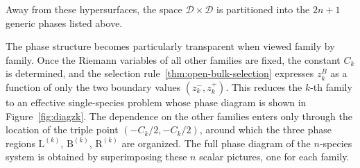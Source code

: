 \documentclass[12pt]{article}
\begin{document}
Away from these hypersurfaces, the space
$\mathcal{D}\times\mathcal{D}$ is partitioned into the $2n+1$ generic
phases listed above.

The phase structure becomes particularly transparent when viewed
family by family. Once the Riemann variables of all other families
are fixed, the constant $C_k$ is determined, and the selection rule~\ref{thm:open-bulk-selection}
expresses $z_k^B$ as a function of only the two boundary values
$(z_k^-, z_k^+)$. This reduces the $k$-th family to an effective
single-species problem whose phase diagram is shown in
Figure~\ref{fig:diagzk}. The dependence on the other
families enters only through the location of the triple point
$(-C_k/2, -C_k/2)$, around which the three phase regions
$\mathrm{L}^{(k)}$, $\mathrm{B}^{(k)}$, $\mathrm{R}^{(k)}$ are
organized. The full phase diagram of the $n$-species system is
obtained by superimposing these $n$ scalar pictures, one for each
family.
\end{document}
